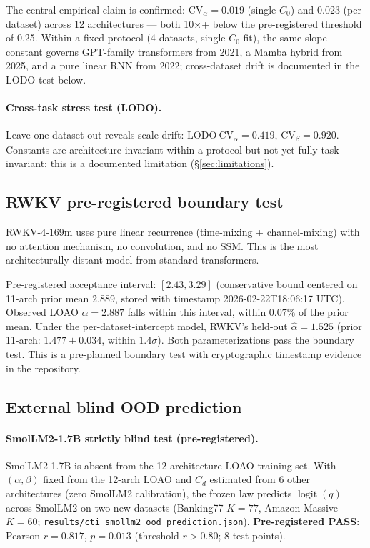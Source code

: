 \documentclass{article}
\DeclareMathOperator{\logit}{logit}
\begin{document}
The central empirical claim is confirmed: $\mathrm{CV}_\alpha=0.019$ (single-$C_0$) and $0.023$ (per-dataset) across 12 architectures --- both 10$\times$+ below the pre-registered threshold of 0.25. Within a fixed protocol (4 datasets, single-$C_0$ fit), the same slope constant governs GPT-family transformers from 2021, a Mamba hybrid from 2025, and a pure linear RNN from 2022; cross-dataset drift is documented in the LODO test below.

\paragraph{Cross-task stress test (LODO).}
Leave-one-dataset-out reveals scale drift: $\mathrm{LODO\ CV}_\alpha=0.419$, $\mathrm{CV}_\beta=0.920$. Constants are architecture-invariant within a protocol but not yet fully task-invariant; this is a documented limitation (\S\ref{sec:limitations}).

\subsection{RWKV pre-registered boundary test}
\label{subsec:rwkv-test}
RWKV-4-169m uses pure linear recurrence (time-mixing + channel-mixing) with no attention mechanism, no convolution, and no SSM. This is the most architecturally distant model from standard transformers.

Pre-registered acceptance interval: $[2.43, 3.29]$ (conservative bound centered on 11-arch prior mean $2.889$, stored with timestamp 2026-02-22T18:06:17 UTC). Observed LOAO $\alpha=2.887$ falls within this interval, within $0.07\%$ of the prior mean. Under the per-dataset-intercept model, RWKV's held-out $\hat\alpha=1.525$ (prior 11-arch: $1.477\pm0.034$, within $1.4\sigma$). Both parameterizations pass the boundary test. This is a pre-planned boundary test with cryptographic timestamp evidence in the repository.

\subsection{External blind OOD prediction}
\label{subsec:smollm2-ood}
\paragraph{SmolLM2-1.7B strictly blind test (pre-registered).}
SmolLM2-1.7B is absent from the 12-architecture LOAO training set. With $(\alpha,\beta)$ fixed from the 12-arch LOAO and $C_d$ estimated from 6 other architectures (zero SmolLM2 calibration), the frozen law predicts $\logit(q)$ across SmolLM2 on two new datasets (Banking77 $K=77$, Amazon Massive $K=60$; \texttt{results/cti\_smollm2\_ood\_prediction.json}).
\textbf{Pre-registered PASS}: Pearson $r=0.817$, $p=0.013$ (threshold $r>0.80$; 8 test points).
\end{document}
